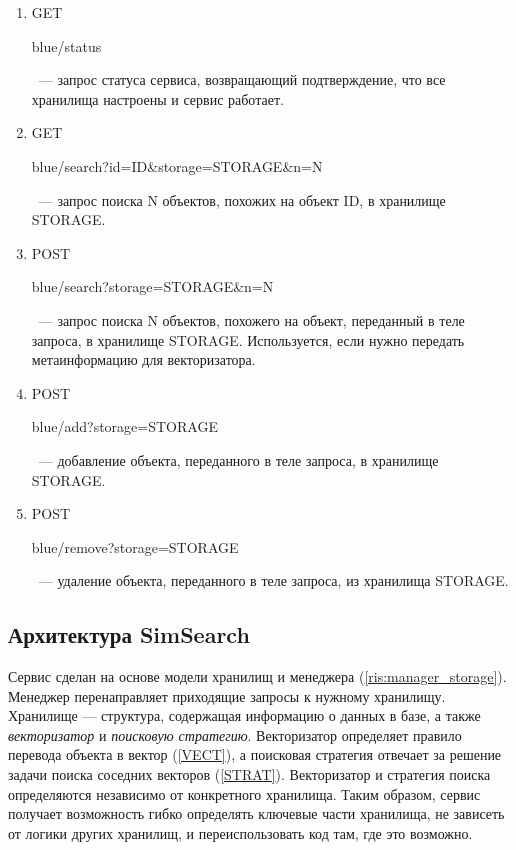 \documentclass[a4paper,12pt]{extarticle}
\begin{document}
\begin{enumerate}

\item GET \begin{color}{blue}/status\end{color}~--- запрос статуса сервиса, возвращающий подтверждение, что все хранилища настроены и сервис работает. 
\item GET \begin{color}{blue}/search?id=ID\&storage=STORAGE\&n=N\end{color}~--- запрос поиска N объектов, похожих на объект ID, в хранилище STORAGE.
\item POST \begin{color}{blue}/search?storage=STORAGE\&n=N \end{color}~--- запрос поиска N объектов, похожего на объект, переданный в теле запроса, в хранилище STORAGE. Используется, если нужно передать метаинформацию для векторизатора.
\item POST \begin{color}{blue}/add?storage=STORAGE\end{color}~--- добавление объекта, переданного в теле запроса, в хранилище STORAGE.
\item POST \begin{color}{blue}/remove?storage=STORAGE\end{color}~--- удаление объекта, переданного в теле запроса, из хранилища STORAGE.

\end{enumerate}

\subsection{Архитектура SimSearch}

Сервис сделан на основе модели хранилищ и менеджера (\cref{ris:manager_storage}). Менеджер перенаправляет приходящие запросы к нужному хранилищу. Хранилище --- структура, содержащая информацию о данных в базе, а также \textit{векторизатор} и \textit{поисковую стратегию}. Векторизатор определяет правило перевода объекта в вектор (\ref{VECT}), а поисковая стратегия отвечает за решение задачи поиска соседних векторов (\ref{STRAT}). Векторизатор и стратегия поиска определяются независимо от конкретного хранилища. Таким образом, сервис получает возможность гибко определять ключевые части хранилища, не зависеть от логики других хранилищ, и переиспользовать код там, где это возможно.
\end{document}
